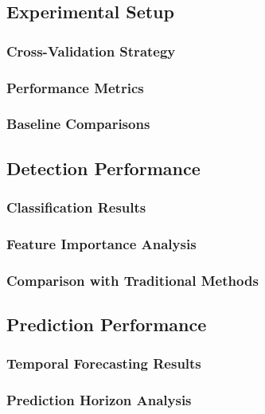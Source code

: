 \documentclass[conference]{IEEEtran}
\begin{document}
\subsection{Experimental Setup}

\subsubsection{Cross-Validation Strategy}

\subsubsection{Performance Metrics}

\subsubsection{Baseline Comparisons}

\subsection{Detection Performance}

\subsubsection{Classification Results}

\subsubsection{Feature Importance Analysis}

\subsubsection{Comparison with Traditional Methods}

\subsection{Prediction Performance}

\subsubsection{Temporal Forecasting Results}

\subsubsection{Prediction Horizon Analysis}
\end{document}
